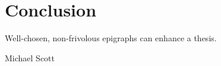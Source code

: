 \chapter*{Conclusion}
	\setcounter{chapter}{4}
	\setcounter{section}{0}
	\epigraph{
	Well-chosen, non-frivolous epigraphs can enhance a thesis.
	}{Michael Scott} 


